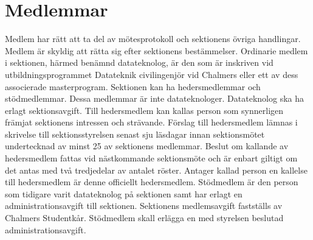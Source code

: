 \documentclass[a4paper]{dteklag}
\begin{document}
\section{Medlemmar}
\para Medlem har rätt att ta del av mötesprotokoll och sektionens övriga handlingar.
\para Medlem är skyldig att rätta sig efter sektionens bestämmelser.
\para[Datateknologer] Ordinarie medlem i sektionen, härmed benämnd datateknolog, är den som är inskriven vid utbildningsprogrammet Datateknik civilingenjör vid Chalmers eller ett av dess associerade masterprogram. 
\para Sektionen kan ha hedersmedlemmar och stödmedlemmar.
\stycke Dessa medlemmar är inte datateknologer.
\para Datateknolog ska ha erlagt sektionsavgift.
\para[Hedersmedlem] Till hedersmedlem kan kallas person som synnerligen främjat sektionens intressen och strävande.
\para Förslag till hedersmedlem lämnas i skrivelse till sektionsstyrelsen senast sju läsdagar innan sektionsmötet undertecknad av minst 25 av sektionens medlemmar.
\para Beslut om kallande av hedersmedlem fattas vid nästkommande sektionsmöte och är enbart giltigt om det antas med två tredjedelar av antalet röster.
\para Antager kallad person en kallelse till hedersmedlem är denne officiellt hedersmedlem.
\para[Stödmedlem] Stödmedlem är den person som tidigare varit datateknolog på sektionen samt har erlagt en administrationsavgift till sektionen.
\para[Avgifter] Sektionens medlemsavgift fastställs av Chalmers Studentkår.
\para Stödmedlem skall erlägga en med styrelsen beslutad administrationsavgift.
\end{document}

